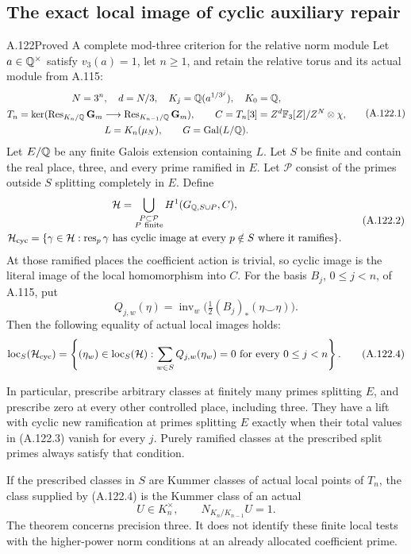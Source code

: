 \subsection{The exact local image of cyclic auxiliary repair}

\begin{statement}{A.122}{Proved}
{A complete mod-three criterion for the relative norm module}
Let \(a\in\mathbb Q^\times\) satisfy \(v_3(a)=1\), let \(n\ge1\),
and retain the relative torus and its actual module from A.115:
\[
 \begin{gathered}
 N=3^n,\quad d=N/3,\quad K_j=\mathbb Q(a^{1/3^j}),\quad K_0=\mathbb Q,\\
 T_n=\ker(\operatorname{Res}_{K_n/\mathbb Q}\mathbf G_m
                 \longrightarrow\operatorname{Res}_{K_{n-1}/\mathbb Q}\mathbf G_m),
 \qquad C=T_n[3]=Z^d\mathbb F_3[Z]/Z^N\otimes\chi,\\
 L=K_n(\mu_N),\qquad G=\operatorname{Gal}(L/\mathbb Q).
 \end{gathered}
 \tag{A.122.1}
\]
Let \(E/\mathbb Q\) be any finite Galois extension containing \(L\).
Let \(S\) be finite and contain the real place, three, and
every prime ramified in \(E\).
Let \(\mathcal P\) consist of the primes outside \(S\)
splitting completely in \(E\).
Define
\[
 \begin{gathered}
 \mathcal H=\bigcup_{\substack{P\subset\mathcal P\\P\ {\rm finite}}}
                         H^1(G_{\mathbb Q,S\cup P},C),\\
 \mathcal H_{\rm cyc}=\{\gamma\in\mathcal H:
       \operatorname{res}_p\gamma\text{ has cyclic image at every }
                                      p\notin S\text{ where it ramifies}\}.
 \end{gathered}
 \tag{A.122.2}
\]
At those ramified places the coefficient action is trivial,
so cyclic image is the literal image of the local
homomorphism into \(C\).
For the basis \(B_j\), \(0\le j<n\), of A.115, put
\[
 Q_{j,w}(\eta)=
       \operatorname{inv}_w\bigl(\tfrac12(B_j)_*(\eta\smile\eta)\bigr).
 \tag{A.122.3}
\]
Then the following equality of actual local images holds:
\[
 \operatorname{loc}_S(\mathcal H_{\rm cyc})=
 \left\{(\eta_w)\in\operatorname{loc}_S(\mathcal H):
             \sum_{w\in S}Q_{j,w}(\eta_w)=0
                                \text{ for every }0\le j<n\right\}.
 \tag{A.122.4}
\]

In particular, prescribe arbitrary classes at finitely
many primes splitting \(E\), and prescribe zero at every
other controlled place, including three.
They have a lift with cyclic new ramification at primes
splitting \(E\) exactly when their total values in
(A.122.3) vanish for every \(j\).
Purely ramified classes at the prescribed split primes
always satisfy that condition.

If the prescribed classes in \(S\) are Kummer classes
of actual local points of \(T_n\), the class supplied
by (A.122.4) is the Kummer class of an actual
\[
             U\in K_n^\times,\qquad
                         N_{K_n/K_{n-1}}U=1 .
 \tag{A.122.5}
\]
The theorem concerns precision three.
It does not identify these finite local tests with
the higher-power norm conditions at an already
allocated coefficient prime.
\end{statement}

